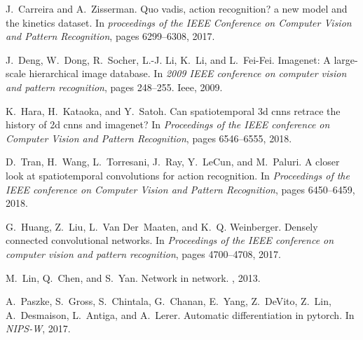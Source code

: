 \documentclass[10pt,twocolumn,letterpaper]{article}
\begin{document}
{\begin{thebibliography}{10}
J.~Carreira and A.~Zisserman.
\newblock Quo vadis, action recognition? a new model and the kinetics dataset.
\newblock In {\em proceedings of the IEEE Conference on Computer Vision and Pattern Recognition}, pages 6299--6308, 2017.

J.~Deng, W.~Dong, R.~Socher, L.-J. Li, K.~Li, and L.~Fei-Fei.
\newblock Imagenet: A large-scale hierarchical image database.
\newblock In {\em 2009 IEEE conference on computer vision and pattern recognition}, pages 248--255. Ieee, 2009.

K.~Hara, H.~Kataoka, and Y.~Satoh.
\newblock Can spatiotemporal 3d cnns retrace the history of 2d cnns and imagenet?
\newblock In {\em Proceedings of the IEEE conference on Computer Vision and Pattern Recognition}, pages 6546--6555, 2018.

D.~Tran, H.~Wang, L.~Torresani, J.~Ray, Y.~LeCun, and M.~Paluri.
\newblock A closer look at spatiotemporal convolutions for action recognition.
\newblock In {\em Proceedings of the IEEE conference on Computer Vision and Pattern Recognition}, pages 6450--6459, 2018.

G.~Huang, Z.~Liu, L.~Van Der~Maaten, and K.~Q. Weinberger.
\newblock Densely connected convolutional networks.
\newblock In {\em Proceedings of the IEEE conference on computer vision and pattern recognition}, pages 4700--4708, 2017.

M.~Lin, Q.~Chen, and S.~Yan.
\newblock Network in network.
, 2013.

A.~Paszke, S.~Gross, S.~Chintala, G.~Chanan, E.~Yang, Z.~DeVito, Z.~Lin, A.~Desmaison, L.~Antiga, and A.~Lerer.
\newblock Automatic differentiation in pytorch.
\newblock In {\em NIPS-W}, 2017.

\end{thebibliography}
}
\end{document}
